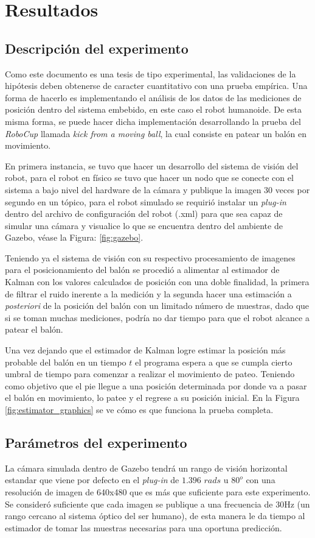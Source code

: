 \chapter{Resultados}
\section{Descripción del experimento}
	Como este documento es una tesis de tipo experimental, las validaciones de la hipótesis deben obtenerse de caracter cuantitativo con una prueba empírica. Una forma de hacerlo es implementando el análisis de los datos de las mediciones de posición dentro del sistema embebido, en este caso el robot humanoide. De esta misma forma, se puede hacer dicha implementación desarrollando la prueba del \textit{RoboCup} llamada \textit{kick from a moving ball}, la cual consiste en patear un balón en movimiento.

	En primera instancia, se tuvo que hacer un desarrollo del sistema de visión del robot, para el robot en físico se tuvo que hacer un nodo que se conecte con el sistema a bajo nivel del hardware de la cámara y publique la imagen 30 veces por segundo en un tópico, para el robot simulado se requirió instalar un \textit{plug-in} dentro del archivo de configuración del robot (.xml) para que sea capaz de simular una cámara y visualice lo que se encuentra dentro del ambiente de Gazebo, véase la Figura: \ref{fig:gazebo}.

	Teniendo ya el sistema de visión con su respectivo procesamiento de imagenes para el posicionamiento del balón se procedió a alimentar al estimador de Kalman con los valores calculados de posición con una doble finalidad, la primera de filtrar el ruido inerente a la medición y la segunda hacer una estimación a \textit{posteriori} de la posición del balón con un limitado número de muestras, dado que si se toman muchas mediciones, podría no dar tiempo para que el robot alcance a patear el balón.
	
	Una vez dejando que el estimador de Kalman logre estimar la posición más probable del balón en un tiempo $t$ el programa espera a que se cumpla cierto umbral de tiempo para comenzar a realizar el movimiento de pateo. Teniendo como objetivo que el pie llegue a una posición determinada por donde va a pasar el balón en movimiento, lo patee y el regrese a su posición inicial. En la Figura \ref{fig:estimator_graphics} se ve cómo es que funciona la prueba completa.
	
\section{Parámetros del experimento}
	La cámara simulada dentro de Gazebo tendrá un rango de visión horizontal estandar que viene por defecto en el \textit{plug-in} de $1.396$ $ rads$ u $80^o$ con una resolución de imagen de 640x480 que es más que suficiente para este experimento. Se consideró suficiente que cada imagen se publique a una frecuencia de 30Hz (un rango cercano al sistema óptico del ser humano), de esta manera le da tiempo al estimador de tomar las muestras necesarias para una oportuna predicción.

